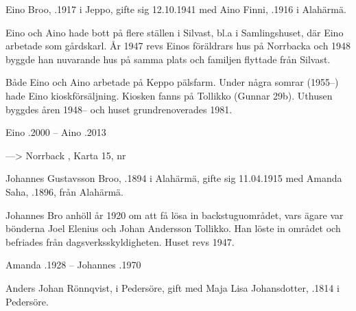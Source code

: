 Eino Broo, .1917 i Jeppo, gifte sig 12.10.1941 med Aino Finni, .1916 i Alahärmä.

\begin{jhchildren}
  \item {}
  \item {}
  \item {}
  \item {}
\end{jhchildren}
Eino och Aino hade bott på flere ställen i Silvast, bl.a i Samlingshuset, där Eino arbetade som gårdskarl. År 1947 revs Einos föräldrars hus på Norrbacka och 1948 byggde han nuvarande hus på samma plats och familjen flyttade från Silvast.

Både Eino och Aino arbetade på Keppo pälsfarm. Under några somrar (1955--) hade Eino kioskförsäljning. Kiosken fanns på Tollikko (Gunnar 29b). Uthusen byggdes åren 1948-- och huset grundrenoverades 1981.

Eino .2000  --  Aino .2013


---> Norrback ,	Karta 15,  nr 


Johannes Gustavsson Broo, .1894 i Alahärmä, gifte sig 11.04.1915 med Amanda Saha, .1896,  från Alahärmä.

\begin{jhchildren}
  \item {}
  \item {}
  \item {}
  \item {}
\end{jhchildren}

Johannes Bro anhöll år 1920 om att få lösa in backstuguområdet, vars ägare var bönderna Joel Elenius och Johan Andersson Tollikko. Han löste in området och befriades från dagsverksskyldigheten. Huset revs 1947.

Amanda .1928  --  Johannes .1970


Anders Johan Rönnqvist,  i Pedersöre, gift med Maja Lisa Johansdotter, .1814 i Pedersöre.


